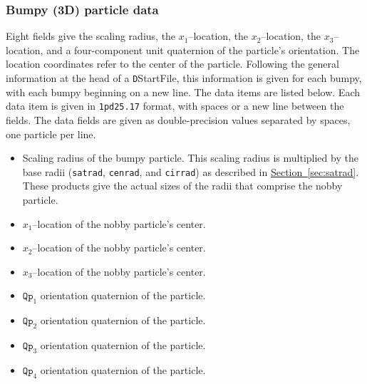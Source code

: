 \documentclass[letterpaper,11pt]{article}
\begin{document}
\subsubsection{Bumpy (3D) particle data}\label{sec:bumpy_data}
Eight fields give the scaling radius, 
the $x_{1}$--location, the $x_{2}$--location, 
the $x_{3}$--location, and a four-component unit quaternion
of the particle's orientation.
The location coordinates refer to the center of the particle.
Following the general information at the head of a
\texttt{D}\textsf{StartFile}, this
information is given for each bumpy,
with each bumpy beginning on a new line.
The data items are listed below.
Each data item is given in \texttt{1pd25.17} format, with
spaces or a new line between the fields.
The data fields are given as double-precision values
separated by spaces, one particle per line.
%
\begin{itemize}
\item
Scaling radius of the bumpy particle.
This scaling radius is multiplied by the base radii
(\texttt{satrad}, \texttt{cenrad}, and \texttt{cirrad}) as described
in \hyperref[sec:satrad]{Section~\ref*{sec:satrad}}.
These products give the actual sizes of the radii that comprise
the nobby particle.
\item
$x_{1}$--location of the nobby particle's center.
\item
$x_{2}$--location of the nobby particle's center.
\item
$x_{3}$--location of the nobby particle's center.
\item
$\mathtt{Qp}_{1}$ orientation quaternion of the particle.
\item
$\mathtt{Qp}_{2}$ orientation quaternion of the particle.
\item
$\mathtt{Qp}_{3}$ orientation quaternion of the particle.
\item
$\mathtt{Qp}_{4}$ orientation quaternion of the particle.
\end{itemize}
%
%
\end{document}
